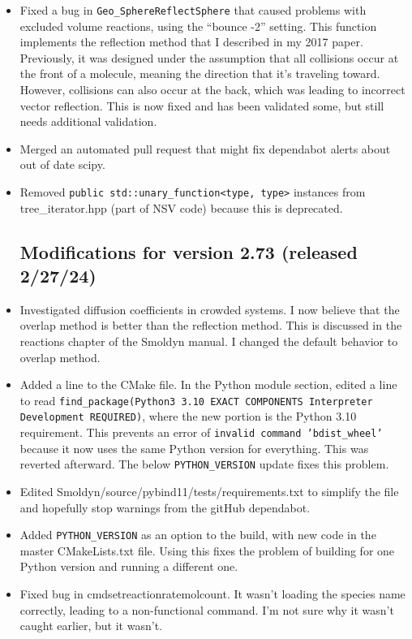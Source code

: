 \documentclass {scrbook}
\newcommand {\ttt} {\texttt}
\begin{document}
\begin{itemize}
\item Fixed a bug in \ttt{Geo\_SphereReflectSphere} that caused problems with excluded volume reactions, using the ``bounce -2'' setting. This function implements the reflection method that I described in my 2017 paper. Previously, it was designed under the assumption that all collisions occur at the front of a molecule, meaning the direction that it's traveling toward. However, collisions can also occur at the back, which was leading to incorrect vector reflection. This is now fixed and has been validated some, but still needs additional validation.
\item Merged an automated pull request that might fix dependabot alerts about out of date scipy.
\item Removed \ttt{public std::unary\_function<type, type>} instances from tree\_iterator.hpp (part of NSV code) because this is deprecated.

\subsection{Modifications for version 2.73 (released 2/27/24)}
\item Investigated diffusion coefficients in crowded systems. I now believe that the overlap method is better than the reflection method. This is discussed in the reactions chapter of the Smoldyn manual. I changed the default behavior to overlap method.
\item Added a line to the CMake file. In the Python module section, edited a line to read \ttt{find\_package(Python3 3.10 EXACT COMPONENTS Interpreter Development REQUIRED)}, where the new portion is the Python 3.10 requirement. This prevents an error of \ttt{invalid command 'bdist\_wheel'} because it now uses the same Python version for everything. This was reverted afterward. The below \ttt{PYTHON\_VERSION} update fixes this problem.
\item Edited Smoldyn/source/pybind11/tests/requirements.txt to simplify the file and hopefully stop warnings from the gitHub dependabot.
\item Added \ttt{PYTHON\_VERSION} as an option to the build, with new code in the master CMakeLists.txt file. Using this fixes the problem of building for one Python version and running a different one.
\item Fixed bug in cmdsetreactionratemolcount. It wasn't loading the species name correctly, leading to a non-functional command. I'm not sure why it wasn't caught earlier, but it wasn't.


\end{itemize}
\end{document}
